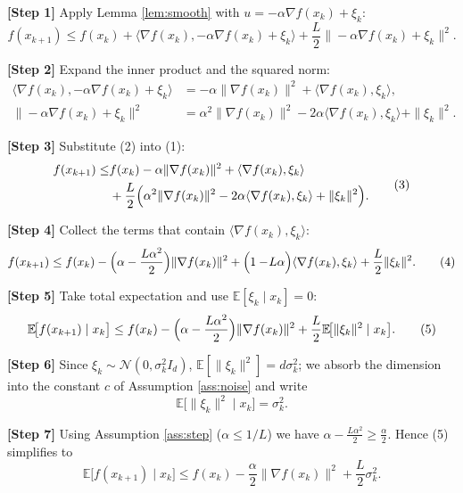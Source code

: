 \documentclass[11pt]{article}
\newcommand{\E}{\mathbb{E}}
\begin{document}
\bigskip
\noindent\textbf{[Step 1]} Apply Lemma \ref{lem:smooth} with $u= -\alpha\nabla f(x_{k})+\xi_{k}$:
\[
f(x_{k+1})\le f(x_{k})+\big\langle\nabla f(x_{k}),-\alpha\nabla f(x_{k})+\xi_{k}\big\rangle
+\frac{L}{2}\big\|-\alpha\nabla f(x_{k})+\xi_{k}\big\|^{2}.
\tag{1}
\]

\noindent\textbf{[Step 2]} Expand the inner product and the squared norm:
\[
\begin{aligned}
\big\langle\nabla f(x_{k}),-\alpha\nabla f(x_{k})+\xi_{k}\big\rangle
&= -\alpha\|\nabla f(x_{k})\|^{2}+\langle\nabla f(x_{k}),\xi_{k}\rangle,\\[4pt]
\big\|-\alpha\nabla f(x_{k})+\xi_{k}\big\|^{2}
&= \alpha^{2}\|\nabla f(x_{k})\|^{2}-2\alpha\langle\nabla f(x_{k}),\xi_{k}\rangle+\|\xi_{k}\|^{2}.
\end{aligned}
\tag{2}
\]

\noindent\textbf{[Step 3]} Substitute (2) into (1):
\[
\begin{aligned}
f(x_{k+1})\le &
f(x_{k})-\alpha\|\nabla f(x_{k})\|^{2}
+\langle\nabla f(x_{k}),\xi_{k}\rangle\\
&+\frac{L}{2}\Bigl(\alpha^{2}\|\nabla f(x_{k})\|^{2}
-2\alpha\langle\nabla f(x_{k}),\xi_{k}\rangle
+\|\xi_{k}\|^{2}\Bigr).
\end{aligned}
\tag{3}
\]

\noindent\textbf{[Step 4]} Collect the terms that contain $\langle\nabla f(x_{k}),\xi_{k}\rangle$:
\[
f(x_{k+1})\le f(x_{k})
-\Bigl(\alpha-\frac{L\alpha^{2}}{2}\Bigr)\|\nabla f(x_{k})\|^{2}
+\Bigl(1-\!L\alpha\Bigr)\langle\nabla f(x_{k}),\xi_{k}\rangle
+\frac{L}{2}\|\xi_{k}\|^{2}.
\tag{4}
\]

\noindent\textbf{[Step 5]} Take total expectation and use $\E[\xi_{k}\mid x_{k}]=0$:
\[
\E\!\bigl[f(x_{k+1})\mid x_{k}\bigr]\le 
f(x_{k})-\Bigl(\alpha-\frac{L\alpha^{2}}{2}\Bigr)\|\nabla f(x_{k})\|^{2}
+\frac{L}{2}\E\!\bigl[\|\xi_{k}\|^{2}\mid x_{k}\bigr].
\tag{5}
\]

\noindent\textbf{[Step 6]} Since $\xi_{k}\sim\mathcal N(0,\sigma_{k}^{2}I_{d})$, $\E[\|\xi_{k}\|^{2}]=d\sigma_{k}^{2}$; we absorb the dimension into the constant $c$ of Assumption \ref{ass:noise} and write
\[
\E\!\bigl[\|\xi_{k}\|^{2}\mid x_{k}\bigr]=\sigma_{k}^{2}.
\tag{6}
\]

\noindent\textbf{[Step 7]} Using Assumption \ref{ass:step} ($\alpha\le 1/L$) we have $\alpha-\frac{L\alpha^{2}}{2}\ge \frac{\alpha}{2}$. Hence (5) simplifies to
\[
\E\!\bigl[f(x_{k+1})\mid x_{k}\bigr]\le 
f(x_{k})-\frac{\alpha}{2}\|\nabla f(x_{k})\|^{2}
+\frac{L}{2}\sigma_{k}^{2}.
\tag{7}
\]
\end{document}
